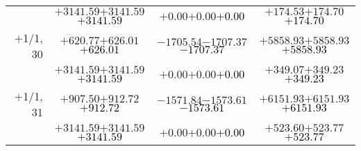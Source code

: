 \documentclass[compress]{beamer}
\begin{document}
\begin{frame}
{\begin{tabular}{r | c | c | c}
           & $+3141.59$\hspace{0.1 cm}$+3141.59$\hspace{0.1 cm}\textcolor{black}{$+3141.59$} & $+0.00$\hspace{0.1 cm}$+0.00$\hspace{0.1 cm}\textcolor{black}{$+0.00$} & $+174.53$\hspace{0.1 cm}$+174.70$\hspace{0.1 cm}\textcolor{black}{$+174.70$} \\
$+$1/1, 30 & $+620.77$\hspace{0.1 cm}$+626.01$\hspace{0.1 cm}\textcolor{black}{$+626.01$} & $-1705.54$\hspace{0.1 cm}$-1707.37$\hspace{0.1 cm}\textcolor{black}{$-1707.37$} & $+5858.93$\hspace{0.1 cm}$+5858.93$\hspace{0.1 cm}\textcolor{black}{$+5858.93$} \\
           & $+3141.59$\hspace{0.1 cm}$+3141.59$\hspace{0.1 cm}\textcolor{black}{$+3141.59$} & $+0.00$\hspace{0.1 cm}$+0.00$\hspace{0.1 cm}\textcolor{black}{$+0.00$} & $+349.07$\hspace{0.1 cm}$+349.23$\hspace{0.1 cm}\textcolor{black}{$+349.23$} \\
$+$1/1, 31 & $+907.50$\hspace{0.1 cm}$+912.72$\hspace{0.1 cm}\textcolor{black}{$+912.72$} & $-1571.84$\hspace{0.1 cm}$-1573.61$\hspace{0.1 cm}\textcolor{black}{$-1573.61$} & $+6151.93$\hspace{0.1 cm}$+6151.93$\hspace{0.1 cm}\textcolor{black}{$+6151.93$} \\
           & $+3141.59$\hspace{0.1 cm}$+3141.59$\hspace{0.1 cm}\textcolor{black}{$+3141.59$} & $+0.00$\hspace{0.1 cm}$+0.00$\hspace{0.1 cm}\textcolor{black}{$+0.00$} & $+523.60$\hspace{0.1 cm}$+523.77$\hspace{0.1 cm}\textcolor{black}{$+523.77$} \\

\end{tabular}}
\end{frame}
\end{document}
